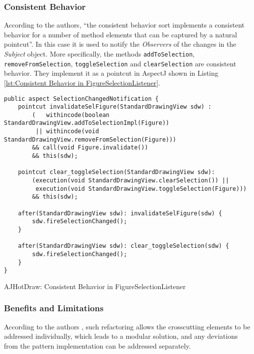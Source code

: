 \subsubsection{Consistent Behavior}
According to the authors\cite{marin2005classification}, ``the consistent behavior sort implements a consistent behavior for a number of method elements that can be captured by a natural pointcut''.
In this case it is used to notify the \textit{Observers} of the changes in the \textit{Subject} object.
More specifically, the methods \texttt{addToSelection}, \texttt{removeFromSelection}, \texttt{toggleSelection} and \texttt{clearSelection} are consistent behavior.
They implement it as a pointcut in AspectJ shown in Listing \ref{lst:Consistent Behavior in FigureSelectionListener}.

\begin{sourcecode} [H]
	\begin{lstlisting}[language=AspectJ]
public aspect SelectionChangedNotification {
	pointcut invalidateSelFigure(StandardDrawingView sdw) :
		(   withincode(boolean StandardDrawingView.addToSelectionImpl(Figure)) 
		 || withincode(void StandardDrawingView.removeFromSelection(Figure)))
		&& call(void Figure.invalidate()) 
		&& this(sdw);

	pointcut clear_toggleSelection(StandardDrawingView sdw):
		(execution(void StandardDrawingView.clearSelection()) ||
		 execution(void StandardDrawingView.toggleSelection(Figure)))
		&& this(sdw);

	after(StandardDrawingView sdw): invalidateSelFigure(sdw) {
		sdw.fireSelectionChanged();
	}

	after(StandardDrawingView sdw): clear_toggleSelection(sdw) {
		sdw.fireSelectionChanged();
	}
}
	\end{lstlisting}
	\caption{AJHotDraw: Consistent Behavior in FigureSelectionListener}
	\label{lst:Consistent Behavior in FigureSelectionListener}
\end{sourcecode}

\subsubsection{Benefits and Limitations}
According to the authors \cite{marin2005approach}, such refactoring allows the crosscutting elements to be addressed individually, which leads to a modular solution, and any deviations from the pattern implementation can be addressed separately.

